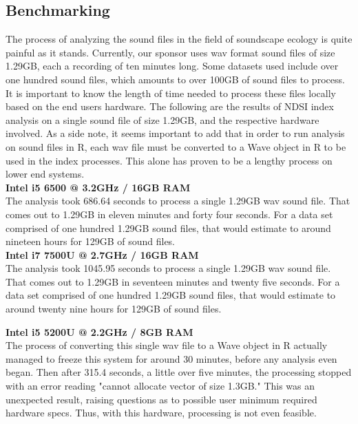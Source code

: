 \subsection{Benchmarking}
The process of analyzing the sound files in the field of soundscape ecology is quite painful as it stands. Currently, our sponsor uses wav format sound files of size 1.29GB, each a recording of ten minutes long. Some datasets used include over one hundred sound files, which amounts to over 100GB of sound files to process. It is important to know the length of time needed to process these files locally based on the end user\textquotesingle s hardware. The following are the results of NDSI index analysis on a single sound file of size 1.29GB, and the respective hardware involved. As a side note, it seems important to add that in order to run analysis on sound files in R, each wav file must be converted to a Wave object in R to be used in the index processes. This alone has proven to be a lengthy process on lower end systems.\\

\noindent\textbf{Intel i5 6500 @ 3.2GHz / 16GB RAM}\\
The analysis took 686.64 seconds to process a single 1.29GB wav sound file. That comes out to 1.29GB in eleven minutes and forty four seconds. For a data set comprised of one hundred 1.29GB sound files, that would estimate to around nineteen hours for 129GB of sound files.\\

\noindent\textbf{Intel i7 7500U @ 2.7GHz / 16GB RAM}\\
The analysis took 1045.95 seconds to process a single 1.29GB wav sound file. That comes out to 1.29GB in seventeen minutes and twenty five seconds. For a data set comprised of one hundred 1.29GB sound files, that would estimate to around twenty nine hours for 129GB of sound files.

\noindent\textbf{Intel i5 5200U @ 2.2GHz / 8GB RAM}\\
The process of converting this single wav file to a Wave object in R actually managed to freeze this system for around 30 minutes, before any analysis even began. Then after 315.4 seconds, a little over five minutes, the processing stopped with an error reading "cannot allocate vector of size 1.3GB." This was an unexpected result, raising questions as to possible user minimum required hardware specs. Thus, with this hardware, processing is not even feasible.\\

